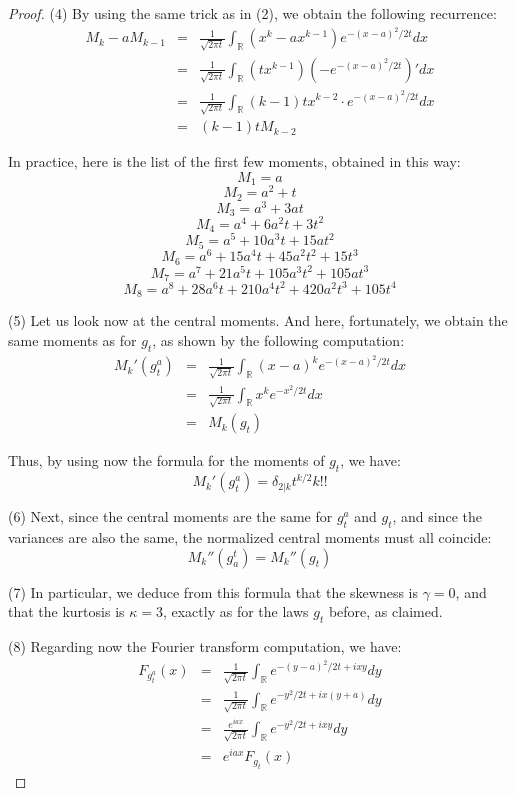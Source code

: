 \documentclass[12pt]{amsbook}
\begin{document}
\begin{proof}
(4) By using the same trick as in (2), we obtain the following recurrence:
\begin{eqnarray*}
M_k-aM_{k-1}
&=&\frac{1}{\sqrt{2\pi t}}\int_\mathbb R(x^k-ax^{k-1})e^{-(x-a)^2/2t}dx\\
&=&\frac{1}{\sqrt{2\pi t}}\int_\mathbb R(tx^{k-1})\left(-e^{-(x-a)^2/2t}\right)'dx\\
&=&\frac{1}{\sqrt{2\pi t}}\int_\mathbb R(k-1)tx^{k-2}\cdot e^{-(x-a)^2/2t}dx\\
&=&(k-1)tM_{k-2}
\end{eqnarray*}

In practice, here is the list of the first few moments, obtained in this way:
$$M_1=a$$
$$M_2=a^2+t$$
$$M_3=a^3+3at$$
$$M_4=a^4+6a^2t+3t^2$$
$$M_5=a^5+10a^3t+15at^2$$
$$M_6=a^6+15a^4t+45a^2t^2+15t^3$$
$$M_7=a^7+21a^5t+105a^3t^2+105at^3$$
$$M_8=a^8+28a^6t+210a^4t^2+420a^2t^3+105t^4$$

(5) Let us look now at the central moments. And here, fortunately, we obtain the same moments as for $g_t$, as shown by the following computation:
\begin{eqnarray*}
M_k'(g_t^a)
&=&\frac{1}{\sqrt{2\pi t}}\int_\mathbb R(x-a)^ke^{-(x-a)^2/2t}dx\\
&=&\frac{1}{\sqrt{2\pi t}}\int_\mathbb Rx^ke^{-x^2/2t}dx\\
&=&M_k(g_t)
\end{eqnarray*}

Thus, by using now the formula for the moments of $g_t$, we have:
$$M_k'(g_t^a)=\delta_{2|k}t^{k/2}k!!$$

(6) Next, since the central moments are the same for $g_t^a$ and $g_t$, and since the variances are also the same, the normalized central moments must all coincide:
$$M_k''(g^t_a)=M_k''(g_t)$$

(7) In particular, we deduce from this formula that the skewness is $\gamma=0$, and that the kurtosis is $\kappa=3$, exactly as for the laws $g_t$ before, as claimed.

\medskip

(8) Regarding now the Fourier transform computation, we have:
\begin{eqnarray*}
F_{g_t^a}(x)
&=&\frac{1}{\sqrt{2\pi t}}\int_\mathbb Re^{-(y-a)^2/2t+ixy}dy\\
&=&\frac{1}{\sqrt{2\pi t}}\int_\mathbb Re^{-y^2/2t+ix(y+a)}dy\\
&=&\frac{e^{iax}}{\sqrt{2\pi t}}\int_\mathbb Re^{-y^2/2t+ixy}dy\\
&=&e^{iax}F_{g_t}(x)
\end{eqnarray*}


\end{proof}
\end{document}

